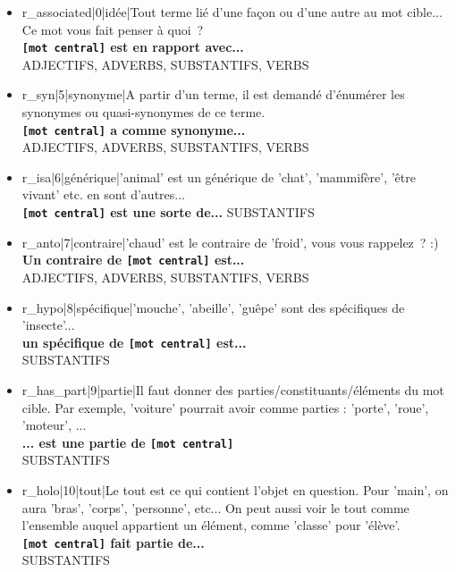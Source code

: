 \documentclass[a4paper,11pt,french]{article}
\begin{document}
\begin{itemize}

\item r\_associated|0|idée|Tout terme lié d'une façon ou d'une autre au mot cible... Ce mot vous fait penser à quoi~? \\
{\bf \verb![mot central]! est en rapport avec...} \\
ADJECTIFS, ADVERBS, SUBSTANTIFS, VERBS

\item r\_syn|5|synonyme|A partir d'un terme, il est demandé d'énumérer les synonymes ou quasi-synonymes de ce terme. \\
{\bf \verb![mot central]! a comme synonyme...} \\
ADJECTIFS, ADVERBS, SUBSTANTIFS, VERBS

\item r\_isa|6|générique|'animal' est un générique de 'chat', 'mammifère', 'être vivant' etc. en sont d'autres... \\
{\bf \verb![mot central]! est une sorte de...}
SUBSTANTIFS

\item r\_anto|7|contraire|'chaud' est le contraire de 'froid', vous vous rappelez~? :) \\
{\bf Un contraire de \verb![mot central]! est...} \\
ADJECTIFS, ADVERBS, SUBSTANTIFS, VERBS

\item r\_hypo|8|spécifique|'mouche', 'abeille', 'guêpe' sont des spécifiques de 'insecte'... \\
{\bf un spécifique de \verb![mot central]! est...} \\
SUBSTANTIFS 

\item r\_has\_part|9|partie|Il faut donner des parties/constituants/éléments du mot cible. Par exemple, 'voiture' pourrait avoir comme parties : 'porte', 'roue', 'moteur', ... \\
{\bf ... est une partie de \verb![mot central]!} \\
SUBSTANTIFS

\item r\_holo|10|tout|Le tout est ce qui contient l'objet en question. Pour 'main', on aura 'bras', 'corps', 'personne', etc... On peut aussi voir le tout comme l'ensemble auquel appartient un élément, comme 'classe' pour 'élève'. \\
{\bf \verb![mot central]! fait partie de...} \\
SUBSTANTIFS


\end{itemize}
\end{document}

